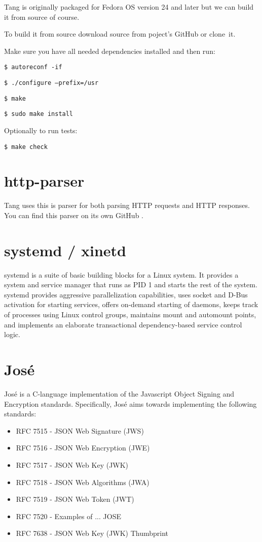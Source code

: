 \documentclass[../xdudla00-porting-Tang-to-Open-WRT.tex]{subfiles}
\begin{document}
Tang is originally packaged for Fedora OS version 24 and later but we can build it from source of course.

To build it from source download source from poject's GitHub or clone~it.

Make sure you have all needed dependencies installed and then run:

{\tt \$ autoreconf -if}

{\tt \$ ./configure --prefix=/usr}

{\tt \$ make}

{\tt \$ sudo make install}

Optionally to run tests:

{\tt \$ make check}

\section{http-parser}\label{parser}
Tang uses this is parser for both parsing HTTP requests and HTTP responses.
You can find this parser on its own GitHub \cite{http-parser}.

\section{systemd / xinetd}\label{systemd}
systemd \cite{systemd} is a suite of basic building blocks for a Linux system. It provides a system and service manager that runs as PID 1 and starts the rest of the system. systemd provides aggressive parallelization capabilities, uses socket and D-Bus activation for starting services, offers on-demand starting of daemons, keeps track of processes using Linux control groups, maintains mount and automount points, and implements an elaborate transactional dependency-based service control logic.

\section{José}\label{jose}
José \cite{Jos} is a C-language implementation of the Javascript Object Signing and Encryption standards. Specifically, José aims towards implementing the following standards:
\begin{itemize}
   \item RFC 7515 - JSON Web Signature (JWS)        \cite{JWS}
   \item RFC 7516 - JSON Web Encryption (JWE)       \cite{JWE}
   \item RFC 7517 - JSON Web Key (JWK)              \cite{JWK}
   \item RFC 7518 - JSON Web Algorithms (JWA)       \cite{JWA}
   \item RFC 7519 - JSON Web Token (JWT)            \cite{JWT}
   \item RFC 7520 - Examples of ... JOSE
   \item RFC 7638 - JSON Web Key (JWK) Thumbprint   \cite{JWK}
\end{itemize}
\end{document}
